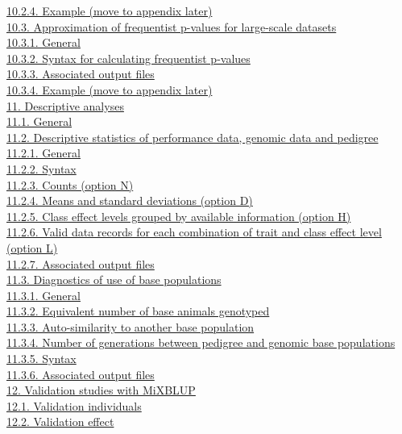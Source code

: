 \hyperref[MTGW07]{10.2.4. Example (move to appendix later)}\\
\hyperref[MTGW08]{10.3. Approximation of frequentist p-values for
large-scale datasets}\\
\hyperref[MTGW09]{10.3.1. General}\\
\hyperref[MTGW10]{10.3.2. Syntax for calculating frequentist p-values}\\
\hyperref[MTGW11]{10.3.3. Associated output files}\\
\hyperref[MTGW12]{10.3.4. Example (move to appendix later)}\\
\hyperref[Desc01]{11. Descriptive analyses}\\
\hyperref[Desc02]{11.1. General}\\
\hyperref[Desc03]{11.2. Descriptive statistics of performance data,
genomic data and pedigree}\\
\hyperref[Desc04]{11.2.1. General}\\
\hyperref[Desc05]{11.2.2. Syntax}\\
\hyperref[Desc06]{11.2.3. Counts (option N)}\\
\hyperref[Desc07]{11.2.4. Means and standard deviations (option D)}\\
\hyperref[Desc08]{11.2.5. Class effect levels grouped by available
information (option H)}\\
\hyperref[Desc09]{11.2.6. Valid data records for each combination of
trait and class effect level (option L)}\\
\hyperref[Desc10]{11.2.7. Associated output files}\\
\hyperref[Desc11]{11.3. Diagnostics of use of base populations}\\
\hyperref[Desc12]{11.3.1. General}\\
\hyperref[Desc13]{11.3.2. Equivalent number of base animals genotyped}\\
\hyperref[Desc14]{11.3.3. Auto-similarity to another base population}\\
\hyperref[Desc15]{11.3.4. Number of generations between pedigree and
genomic base populations}\\
\hyperref[Desc16]{11.3.5. Syntax}\\
\hyperref[Desc17]{11.3.6. Associated output files}\\
\hyperref[Vali01]{12. Validation studies with MiXBLUP}\\
\hyperref[Vali03]{12.1. Validation individuals}\\
\hyperref[Vali04]{12.2. Validation effect}\\
